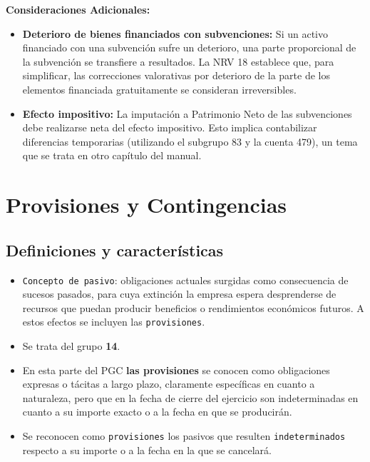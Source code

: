 \documentclass[
  paper=a4,
  ,captions=tableheading
]{scrbook}
\providecommand{\tightlist}{%
  \setlength{\itemsep}{0pt}\setlength{\parskip}{0pt}}
\begin{document}
\textbf{Consideraciones Adicionales:}

\begin{itemize}
\tightlist
\item
  \textbf{Deterioro de bienes financiados con subvenciones:} Si un
  activo financiado con una subvención sufre un deterioro, una parte
  proporcional de la subvención se transfiere a resultados. La NRV 18
  establece que, para simplificar, las correcciones valorativas por
  deterioro de la parte de los elementos financiada gratuitamente se
  consideran irreversibles.
\item
  \textbf{Efecto impositivo:} La imputación a Patrimonio Neto de las
  subvenciones debe realizarse neta del efecto impositivo. Esto implica
  contabilizar diferencias temporarias (utilizando el subgrupo 83 y la
  cuenta 479), un tema que se trata en otro capítulo del manual.
\end{itemize}

\hypertarget{provisiones-y-contingencias}{%
\chapter{Provisiones y
Contingencias}\label{provisiones-y-contingencias}}

\hypertarget{definiciones-y-caracteruxedsticas}{%
\section{Definiciones y
características}\label{definiciones-y-caracteruxedsticas}}

\begin{itemize}
\tightlist
\item
  \texttt{Concepto\ de\ pasivo}: obligaciones actuales surgidas como
  consecuencia de sucesos pasados, para cuya extinción la empresa espera
  desprenderse de recursos que puedan producir beneficios o rendimientos
  económicos futuros. A estos efectos se incluyen las
  \texttt{provisiones}.
\item
  Se trata del grupo \textbf{14}.
\item
  En esta parte del PGC \textbf{las provisiones} se conocen como
  obligaciones expresas o tácitas a largo plazo, claramente específicas
  en cuanto a naturaleza, pero que en la fecha de cierre del ejercicio
  son indeterminadas en cuanto a su importe exacto o a la fecha en que
  se producirán.
\item
  Se reconocen como \texttt{provisiones} los pasivos que resulten
  \texttt{indeterminados} respecto a su importe o a la fecha en la que
  se cancelará.
\end{itemize}
\end{document}
